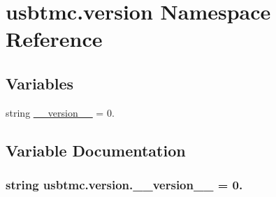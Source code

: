 \hypertarget{namespaceusbtmc_1_1version}{}\section{usbtmc.\+version Namespace Reference}
\label{namespaceusbtmc_1_1version}
\subsection*{Variables}
\begin{DoxyCompactItemize}
\item 
string \hyperlink{namespaceusbtmc_1_1version_adef09069e25efc0c3b04102c0078ef73}{\+\_\+\+\_\+version\+\_\+\+\_\+} = \textquotesingle{}0.\textquotesingle{}
\end{DoxyCompactItemize}


\subsection{Variable Documentation}
\hypertarget{namespaceusbtmc_1_1version_adef09069e25efc0c3b04102c0078ef73}{}
\subsubsection[{\+\_\+\+\_\+version\+\_\+\+\_\+}]{\setlength{\rightskip}{0pt plus 5cm}string usbtmc.\+version.\+\_\+\+\_\+version\+\_\+\+\_\+ = \textquotesingle{}0.\textquotesingle{}}\label{namespaceusbtmc_1_1version_adef09069e25efc0c3b04102c0078ef73}
